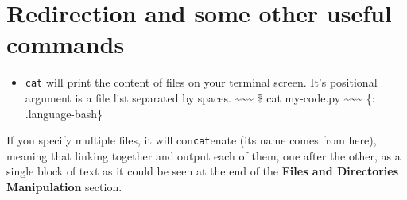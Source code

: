 \documentclass[
]{book}
\providecommand{\tightlist}{%
  \setlength{\itemsep}{0pt}\setlength{\parskip}{0pt}}
\begin{document}
\hypertarget{redirection-and-some-other-useful-commands}{%
\section{Redirection and some other useful commands}\label{redirection-and-some-other-useful-commands}}

\begin{itemize}
\tightlist
\item
  \texttt{cat} will print the content of files on your terminal screen. It's positional argument is a file list separated by spaces.
  \textasciitilde\textasciitilde\textasciitilde{}
  \$ cat my-code.py
  \textasciitilde\textasciitilde\textasciitilde{}
  \{: .language-bash\}
\end{itemize}

If you specify multiple files, it will con\texttt{cat}enate (its name comes from here), meaning that linking together and output each of them, one after the other, as a single block of text as it could be seen at the end of the \textbf{Files and Directories Manipulation} section.
\end{document}
